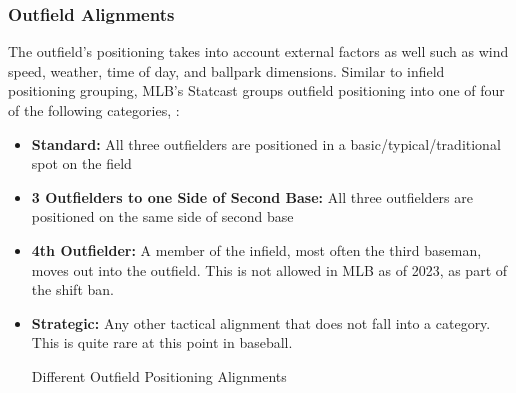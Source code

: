 \documentclass{article}
\begin{document}
\subsubsection{Outfield Alignments}
The outfield's positioning takes into account external factors as well such as wind speed, weather, time of day, and ballpark dimensions. \cite{mlb2023windimpact}\cite{mlbsavant2023catchprobability} Similar to infield positioning grouping, MLB's Statcast groups outfield positioning into one of four of the following categories, \cite{mlb2023shifts}:  

\begin{itemize}
    \item \textbf{Standard:} All three outfielders are positioned in a basic/typical/traditional spot on the field
    \item \textbf{3 Outfielders to one Side of Second Base:} All three outfielders are positioned on the same side of second base
    \item \textbf{4th Outfielder:} A member of the infield, most often the third baseman, moves out into the outfield. This is not allowed in MLB as of 2023, as part of the shift ban. \cite{mlb2023shiftlimits} 
    \item \textbf{Strategic:} Any other tactical alignment that does not fall into a category. This is quite rare at this point in baseball. 
    \caption{Different Outfield Positioning Alignments}
\end{itemize}
\end{document}
